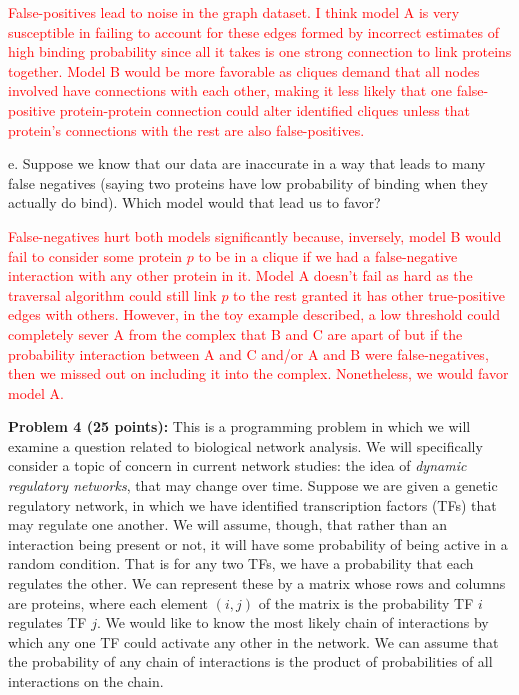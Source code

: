 \documentclass[11pt]{article}
\begin{document}
\textcolor{red}{
False-positives lead to noise in the graph dataset. I think model A is very susceptible in failing to account for these edges formed by incorrect estimates of high binding probability since all it takes is one strong connection to link proteins together. Model B would be more favorable as cliques demand that all nodes involved have connections with each other, making it less likely that one false-positive protein-protein connection could alter identified cliques unless that protein's connections with the rest are also false-positives. 
}

e. Suppose we know that our data are inaccurate in a way that leads to many false negatives
(saying two proteins have low probability of binding when they actually do bind).  Which
model would that lead us to favor?

\textcolor{red}{
False-negatives hurt both models significantly because, inversely, model B would fail to consider some protein $p$ to be in a clique if we had a false-negative interaction with any other protein in it. Model A doesn't fail as hard as the traversal algorithm could still link $p$ to the rest granted it has other true-positive edges with others. However, in the toy example described, a low threshold could completely sever A from the complex that B and C are apart of but if the probability interaction between A and C and/or A and B were false-negatives, then we missed out on including it into the complex. Nonetheless, we would favor model A.
}

{\bf Problem 4 (25 points):} This is a programming problem in which we
will examine a question related to biological network
analysis. We will specifically consider a topic of concern in current network studies: the idea of {\em dynamic regulatory networks}, that
may change over time.   Suppose we are given a genetic regulatory network,
in which we have identified transcription factors (TFs) that may regulate one another.  We will assume, though, that rather than an interaction
being present or not, it will have some probability of being active in
a random condition.  That is for any two TFs, we have a probability that each regulates the other.  We can
represent these by a matrix whose rows and columns are
proteins, where each element $(i,j)$ of the matrix is the probability
TF $i$ regulates TF $j$.  We would like to know the most likely
chain of interactions by which any one TF could activate any
other in the network.  We can assume that the probability of any chain
of interactions is the product of probabilities of all interactions on
the chain.
\end{document}
